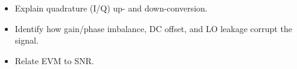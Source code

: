 \begin{objectives}
\begin{itemize}[leftmargin=1.4em,itemsep=2pt]
\item Explain quadrature (I/Q) up- and down-conversion.
\item Identify how gain/phase imbalance, DC offset, and LO leakage corrupt the signal.
\item Relate EVM to SNR.
\end{itemize}
\end{objectives}
